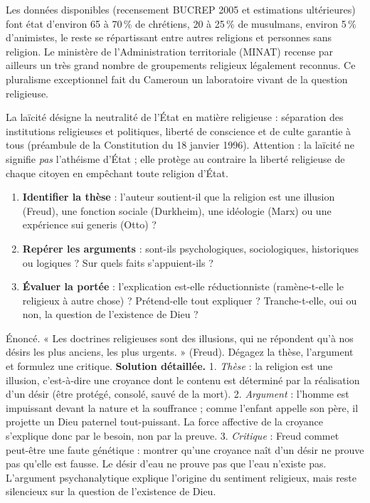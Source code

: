 \documentclass[11pt]{article}
\newcommand{\cle}[1]{{\popxbold\color{popdark}#1}}
\begin{document}
\begin{exemplebox}
Les données disponibles (recensement BUCREP 2005 et estimations ultérieures) font état d'environ 65 à 70\,\% de chrétiens, 20 à 25\,\% de musulmans, environ 5\,\% d'animistes, le reste se répartissant entre autres religions et personnes sans religion. Le ministère de l'Administration territoriale (MINAT) recense par ailleurs un très grand nombre de groupements religieux légalement reconnus. Ce pluralisme exceptionnel fait du Cameroun un laboratoire vivant de la question religieuse.
\end{exemplebox}

\begin{definition}
La \cle{laïcité} désigne la neutralité de l'État en matière religieuse : séparation des institutions religieuses et politiques, liberté de conscience et de culte garantie à tous (préambule de la Constitution du 18 janvier 1996). Attention : la laïcité ne signifie \emph{pas} l'athéisme d'État ; elle protège au contraire la liberté religieuse de chaque citoyen en empêchant toute religion d'État.
\end{definition}

\begin{methode}
\begin{enumerate}
\item \textbf{Identifier la thèse} : l'auteur soutient-il que la religion est une illusion (Freud), une fonction sociale (Durkheim), une idéologie (Marx) ou une expérience sui generis (Otto) ?
\item \textbf{Repérer les arguments} : sont-ils psychologiques, sociologiques, historiques ou logiques ? Sur quels faits s'appuient-ils ?
\item \textbf{Évaluer la portée} : l'explication est-elle réductionniste (ramène-t-elle le religieux à autre chose) ? Prétend-elle tout expliquer ? Tranche-t-elle, oui ou non, la question de l'existence de Dieu ?
\end{enumerate}
\end{methode}

\begin{exoresolu}
Énoncé. « Les doctrines religieuses sont des illusions, qui ne répondent qu'à nos désirs les plus anciens, les plus urgents. » (Freud). Dégagez la thèse, l'argument et formulez une critique.
\tcblower
\textbf{Solution détaillée.}
1. \emph{Thèse} : la religion est une illusion, c'est-à-dire une croyance dont le contenu est déterminé par la réalisation d'un désir (être protégé, consolé, sauvé de la mort).
2. \emph{Argument} : l'homme est impuissant devant la nature et la souffrance ; comme l'enfant appelle son père, il projette un Dieu paternel tout-puissant. La force affective de la croyance s'explique donc par le besoin, non par la preuve.
3. \emph{Critique} : Freud commet peut-être une faute génétique : montrer qu'une croyance naît d'un désir ne prouve pas qu'elle est fausse. Le désir d'eau ne prouve pas que l'eau n'existe pas. L'argument psychanalytique explique l'origine du sentiment religieux, mais reste silencieux sur la question de l'existence de Dieu.
\end{exoresolu}
\end{document}
